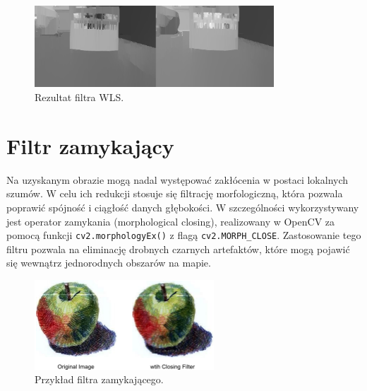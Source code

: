 \documentclass[magisterska]{pracadypl}
\begin{document}
\begin{figure}[H]  %
    \centering  %
    \includegraphics[width=0.8\textwidth]{images/combinedWLS.png}  %
    \captionsetup{font=footnotesize}
    \caption[Rezultat filtra WLS dla StereoSGBM i StereoBM. Opracowanie własne.]{Rezultat filtra WLS.}
\end{figure}

\section{Filtr zamykający}

Na uzyskanym obrazie mogą nadal występować zakłócenia w postaci lokalnych szumów. W celu ich redukcji stosuje się filtrację morfologiczną, która pozwala poprawić spójność i ciągłość danych głębokości. W szczególności wykorzystywany jest operator zamykania (morphological closing), realizowany w OpenCV za pomocą funkcji \texttt{cv2.morphologyEx()} z flagą \texttt{cv2.MORPH\_CLOSE}. Zastosowanie tego filtru pozwala na eliminację drobnych czarnych artefaktów, które mogą pojawić się wewnątrz jednorodnych obszarów na mapie.

\begin{figure}[H]  %
    \centering  %
    \includegraphics[width=0.6\textwidth]{images/closeF.png}  %
    \captionsetup{font=footnotesize}
    \caption[Przykład filtra zamykającego. https://www.graphicsmill.com/docs/gm/minimum-maximum-median-filters.htm]{Przykład filtra zamykającego.}
\end{figure}
\end{document}
